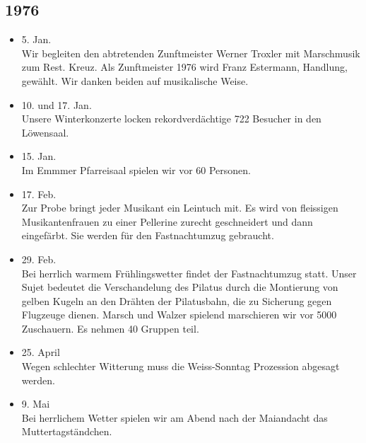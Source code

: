 \subsection{1976}

\begin{history}


    \begin{itemize}

        \item 5. Jan.\\
              Wir begleiten den abtretenden Zunftmeister Werner Troxler mit
              Marschmusik zum Rest. Kreuz. Als Zunftmeister 1976 wird Franz Estermann,
              Handlung, gewählt. Wir danken beiden auf musikalische Weise.

        \item 10. und 17. Jan.\\
              Unsere Winterkonzerte locken rekordverdächtige 722 Besucher in den
              Löwensaal.

        \item 15. Jan.\\
              Im Emmmer Pfarreisaal spielen wir vor 60 Personen.

        \item 17. Feb.\\
              Zur Probe bringt jeder Musikant ein Leintuch mit. Es wird von fleissigen
              Musikantenfrauen zu einer Pellerine zurecht geschneidert und dann
              eingefärbt. Sie werden für den Fastnachtumzug gebraucht.

        \item 29. Feb.\\
              Bei herrlich warmem Frühlingswetter findet der Fastnachtumzug statt.
              Unser Sujet bedeutet die Verschandelung des Pilatus durch die Montierung
              von gelben Kugeln an den Drähten der Pilatusbahn, die zu Sicherung gegen
              Flugzeuge dienen. Marsch und Walzer spielend marschieren wir vor 5000
              Zuschauern. Es nehmen 40 Gruppen teil.

        \item 25. April\\
              Wegen schlechter Witterung muss die Weiss-Sonntag Prozession abgesagt
              werden.

        \item 9. Mai\\
              Bei herrlichem Wetter spielen wir am Abend nach der Maiandacht das
              Muttertagständchen.


\end{itemize}
\end{history}

